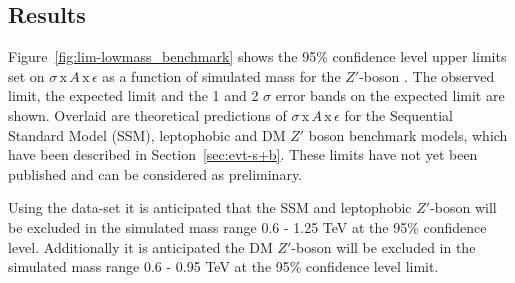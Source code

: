 \subsection{Results}
\label{sec:lim-full_results}

Figure~\ref{fig:lim-lowmass_benchmark} shows the
95\% confidence level upper limits set on $\sigma\,\text{x}\,\mathit{A}\,\text{x}\,\epsilon$
as a function of simulated mass for the $Z'$-boson .
The observed limit, the expected limit and the 1 and 2 $\sigma$ error bands on the expected limit are shown.
Overlaid are theoretical predictions of $\sigma\,\text{x}\,\mathit{A}\,\text{x}\,\epsilon$ for the
Sequential Standard Model (SSM), leptophobic and DM $Z'$ boson benchmark models, which have been described in Section~\ref{sec:evt-s+b}.
These limits have not yet been published and can be considered as preliminary.

Using the \lm{} data-set it is anticipated that the SSM and leptophobic $Z'$-boson
will be excluded in the simulated mass range 0.6 - 1.25 TeV at the 95\% confidence level.
Additionally it is anticipated the DM $Z'$-boson will be excluded in the simulated mass range
0.6 - 0.95 TeV  at the 95\% confidence level limit.

